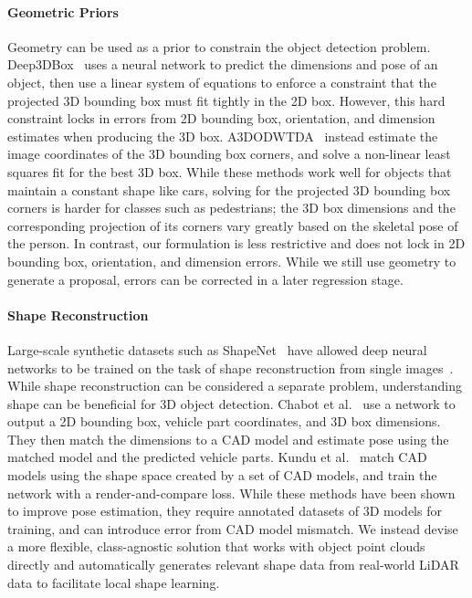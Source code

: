 \documentclass[10pt,twocolumn,letterpaper]{article}
\begin{document}
	\paragraph{Geometric Priors}
	Geometry can be used as a prior to constrain the object detection problem. Deep3DBox~\cite{mousavian_deep3dbox} uses a neural network to predict the dimensions and pose of an object, then use a linear system of equations to enforce a constraint that the projected 3D bounding box must fit tightly in the 2D box. However, this hard constraint locks in errors from 2D bounding box, orientation, and dimension estimates when producing the 3D box. A3DODWTDA~\cite{lindernoren} instead estimate the image coordinates of the 3D bounding box corners, and solve a non-linear least squares fit for the best 3D box. While these methods work well for objects that maintain a constant shape like cars, solving for the projected 3D bounding box corners is harder for classes such as pedestrians; the 3D box dimensions and the corresponding projection of its corners vary greatly based on the skeletal pose of the person. In contrast, our formulation is less restrictive and does not lock in 2D bounding box, orientation, and dimension errors. While we still use geometry to generate a proposal, errors can be corrected in a later regression stage.
	
	\paragraph{Shape Reconstruction}
	Large-scale synthetic datasets such as ShapeNet~\cite{chang2015shapenet} have allowed deep neural networks to be trained on the task of shape reconstruction from single images~\cite{choy20163d, girdhar2016learning, kanazawa2016warpnet, kar2015category, soltani2017synthesizing, tulsiani2017multi, wu2016learning}. While shape reconstruction can be considered a separate problem, understanding shape can be beneficial for 3D object detection. Chabot et al.~\cite{chabot_deepmanta} use a network to output a 2D bounding box, vehicle part coordinates, and 3D box dimensions. They then match the dimensions to a CAD model and estimate pose using the matched model and the predicted vehicle parts. Kundu et al.~\cite{kundu_3drcnn} match CAD models using the shape space created by a set of CAD models, and train the network with a render-and-compare loss. While these methods have been shown to improve pose estimation, they require annotated datasets of 3D models for training, and can introduce error from CAD model mismatch. We instead devise a more flexible, class-agnostic solution that works with object point clouds directly and automatically generates relevant shape data from real-world LiDAR data to facilitate local shape learning.
	
\end{document}
